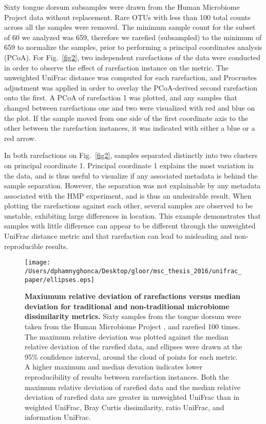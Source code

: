 \documentclass[10pt,letterpaper]{article}
\begin{document}
Sixty tongue dorsum subsamples were drawn from the Human Microbiome Project data without replacement. Rare OTUs with less than 100 total counts across all the samples were removed. The minimum sample count for the subset of 60 we analyzed was 659, therefore we rarefied (subsampled) to the minimum of 659 to normalize the samples, prior to performing a principal coordinates analysis (PCoA). For Fig.~\ref{fig2}, two independent rarefactions of the data were conducted in order to observe the effect of rarefaction instance on the metric. The unweighted UniFrac distance was computed for each rarefaction, and Procrustes adjustment was applied in order to overlay the PCoA-derived second rarefaction onto the first. A PCoA of rarefaction 1 was plotted, and any samples that changed between rarefactions one and two were visualized with red and blue on the plot. If the sample moved from one side of the first coordinate axis to the other between the rarefaction instances, it was indicated with either a blue or a red arrow. 

In both rarefactions on Fig.~\ref{fig2}, samples separated distinctly into two clusters on principal coordinate 1. Principal coordinate 1 explains the most variation in the data, and is thus useful to visualize if any associated metadata is behind the sample separation. However, the separation was not explainable by any metadata associated with the HMP experiment, and is thus an undesirable result. When plotting the rarefactions against each other, several samples are observed to be unstable, exhibiting large differences in location. This example demonstrates that samples with little difference can appear to be different through the unweighted UniFrac distance metric and that rarefaction can lead to misleading and non-reproducible results.

\begin{figure}[h]
\texttt{[image: /Users/dphamnyghonca/Desktop/gloor/msc\_thesis\_2016/unifrac\_paper/ellipses.eps]}
\caption[Maxiumum relative deviation of rarefactions versus median deviation for traditional and non-traditional microbiome dissimilarity metrics.]{{\bf Maxiumum relative deviation of rarefactions versus median deviation for traditional and non-traditional microbiome dissimilarity metrics.} Sixty samples from the tongue dorsum were taken from the Human Microbiome Project \cite{turnbaugh2007human}, and rarefied 100 times. The maximum relative deviation was plotted against the median relative deviation of the rarefied data, and ellipses were drawn at the 95\% confidence interval, around the cloud of points for each metric. A higher maximum and median devation indicates lower reproducibility of results between rarefaction instances. Both the maximum relative deviation of rarefied data and the median relative deviation of rarefied data are greater in unweighted UniFrac than in weighted UniFrac, Bray Curtis dissimilarity, ratio UniFrac, and information UniFrac.}
\label{fig3}
\end{figure}
\end{document}
